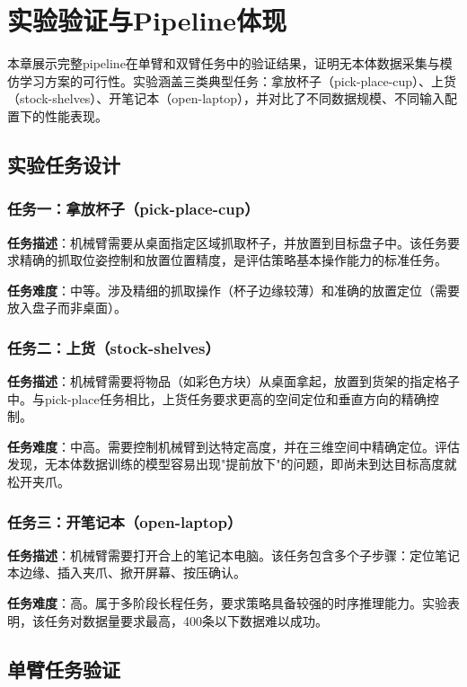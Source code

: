 \section{实验验证与Pipeline体现}

本章展示完整pipeline在单臂和双臂任务中的验证结果，证明无本体数据采集与模仿学习方案的可行性。实验涵盖三类典型任务：拿放杯子（pick-place-cup）、上货（stock-shelves）、开笔记本（open-laptop），并对比了不同数据规模、不同输入配置下的性能表现。

\subsection{实验任务设计}

\subsubsection{任务一：拿放杯子（pick-place-cup）}

\textbf{任务描述}：机械臂需要从桌面指定区域抓取杯子，并放置到目标盘子中。该任务要求精确的抓取位姿控制和放置位置精度，是评估策略基本操作能力的标准任务。

\textbf{任务难度}：中等。涉及精细的抓取操作（杯子边缘较薄）和准确的放置定位（需要放入盘子而非桌面）。

\subsubsection{任务二：上货（stock-shelves）}

\textbf{任务描述}：机械臂需要将物品（如彩色方块）从桌面拿起，放置到货架的指定格子中。与pick-place任务相比，上货任务要求更高的空间定位和垂直方向的精确控制。

\textbf{任务难度}：中高。需要控制机械臂到达特定高度，并在三维空间中精确定位。评估发现，无本体数据训练的模型容易出现"提前放下"的问题，即尚未到达目标高度就松开夹爪。

\subsubsection{任务三：开笔记本（open-laptop）}

\textbf{任务描述}：机械臂需要打开合上的笔记本电脑。该任务包含多个子步骤：定位笔记本边缘、插入夹爪、掀开屏幕、按压确认。

\textbf{任务难度}：高。属于多阶段长程任务，要求策略具备较强的时序推理能力。实验表明，该任务对数据量要求最高，400条以下数据难以成功。

\subsection{单臂任务验证}

